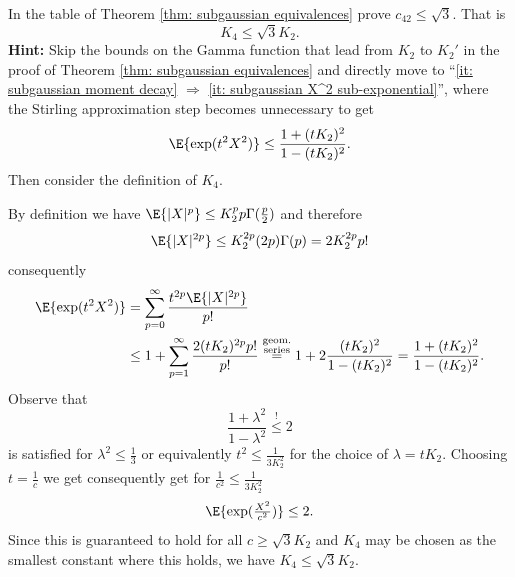 \begin{exercise}[subtitle={Improvement of the subgaussian bound \Coffeecup\Coffeecup}]
    \label{ex: subgaussian bound improvement}
    In the table of Theorem \ref{thm: subgaussian equivalences} prove
    \(c_{42} \le \sqrt{3}\). That is
    \[
        K_4 \le \sqrt{3}K_2.
    \]
    \textbf{Hint:} Skip the bounds on the Gamma function  that lead from \(K_2\)
    to \(K_2'\) in the proof of Theorem \ref{thm: subgaussian equivalences} 
    and directly move to ``\ref{it: subgaussian moment decay} \(\Rightarrow\)
    \ref{it: subgaussian X^2 sub-exponential}'', where the Stirling
    approximation step becomes unnecessary to get
    \[
        \E{\exp(t^2 X^2)} \le \frac{1+(t K_2)^2}{1-(t K_2)^2}.
    \]
    Then consider the definition of \(K_4\).
\end{exercise}

\begin{solution}
    By definition we have \(\E{\abs{X}^p} \le K_2^p p \Gamma(\frac{p}2)\) and 
    therefore  
    \[
        \E{\abs{X}^{2p}} \le K_2^{2p} (2p) \Gamma(p) = 2K_2^{2p} p!
    \]
    consequently
    \begin{align*}
        \E{\exp(t^2 X^2)}
        &= \sum_{p=0}^\infty \frac{t^{2p} \E{\abs{X}^{2p}}}{p!}
        \\
        &\le 1+ \sum_{p=1}^\infty \frac{2(t K_2)^{2p} p!}{p!}
        \overset{\substack{\text{geom.}\\\text{series}}}= 1 + 2\frac{(t K_2)^2}{1-(t K_2)^2}
        = \frac{1+(t K_2)^2}{1-(t K_2)^2}.
    \end{align*}
    Observe that
    \[
        \frac{1+\lambda^2}{1-\lambda^2} \overset{!}\le 2
    \]
    is satisfied for \(\lambda^2 \le \frac13\) or equivalently \(t^2 \le \frac{1}{3K_2^2}\) for the choice of \(\lambda = tK_2\).
    Choosing \(t=\frac1{c}\) we get consequently get for \(\frac1{c^2} \le \frac{1}{3K_2^2}\)
    \[
        \E{\exp(\tfrac{X^2}{c^2})} \le 2.
    \]
    Since this is guaranteed to hold for all \(c \ge \sqrt{3}K_2\) and \(K_4\)
    may be chosen as the smallest constant where this holds, we have \(K_4 \le
    \sqrt{3}K_2\).
\end{solution}

